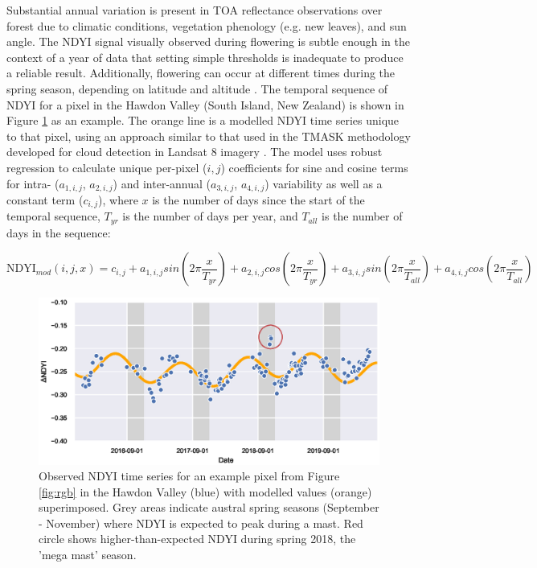 \documentclass[remotesensing,article,submit,moreauthors,pdftex]{Definitions/mdpi}
\begin{document}
Substantial annual variation is present in TOA reflectance observations over forest due to climatic conditions, vegetation phenology (e.g. new leaves), and sun angle. The NDYI signal visually observed during flowering is subtle enough in the context of a year of data that setting simple thresholds is inadequate to produce a reliable result. Additionally, flowering can occur at different times during the spring season, depending on latitude and altitude \citep{Wardle1984,Allen2014}. The temporal sequence of NDYI for a pixel in the Hawdon Valley (South Island, New Zealand) is shown in Figure \ref{fig:sine} as an example. The orange line is a modelled NDYI time series unique to that pixel, using an approach similar to that used in the TMASK methodology developed for cloud detection in Landsat 8 imagery \citep{Zhu2014}. The model uses robust regression to calculate unique per-pixel ($i,j$) coefficients for sine and cosine terms for intra- ($a_{1,i,j}$, $a_{2,i,j}$) and inter-annual ($a_{3,i,j}$, $a_{4,i,j}$) variability as well as a constant term ($c_{i,j}$), where $x$ is the number of days since the start of the temporal sequence, $T_{yr}$ is the number of days per year, and $T_{all}$ is the number of days in the sequence:

\begin{equation}
    \text{NDYI}_{mod}(i,j,x) = c_{i,j} + a_{1,i,j}sin(2\pi\frac{x}{T_{yr}}) + a_{2,i,j}cos(2\pi\frac{x}{T_{yr}}) + a_{3,i,j}sin(2\pi\frac{x}{T_{all}}) + a_{4,i,j}cos(2\pi\frac{x}{T_{all}})
\end{equation}

\begin{figure}[H]
    \centering
    \includegraphics[width=\textwidth]{images/figure2_scatter_examplepixel_2018-2019.eps}%
    \caption{Observed NDYI time series for an example pixel from Figure \ref{fig:rgb} in the Hawdon Valley (blue) with modelled values (orange) superimposed. Grey areas indicate austral spring seasons (September - November) where NDYI is expected to peak during a mast. Red circle shows higher-than-expected NDYI during spring 2018, the 'mega mast' season.}
    \label{fig:sine}
\end{figure}
\end{document}
